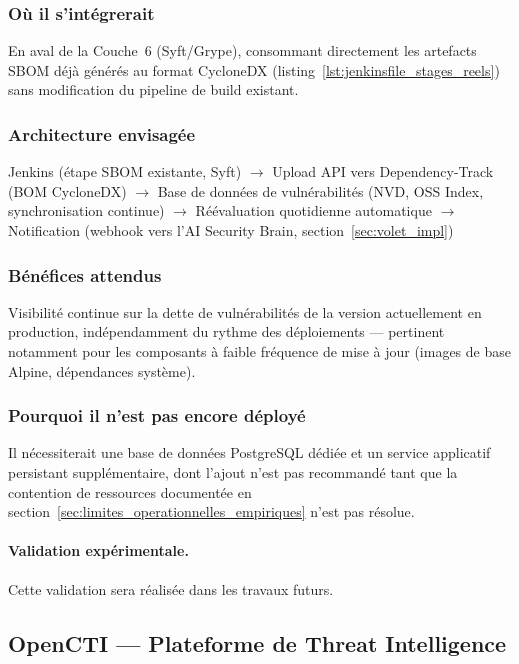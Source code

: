 \subsubsection{Où il s'intégrerait}
En aval de la Couche~6 (Syft/Grype), consommant directement les artefacts SBOM déjà générés au format CycloneDX (listing~\ref{lst:jenkinsfile_stages_reels}) sans modification du pipeline de build existant.

\subsubsection{Architecture envisagée}
\begin{center}
\scriptsize
Jenkins (étape SBOM existante, Syft) $\rightarrow$ Upload API vers Dependency-Track (BOM CycloneDX) $\rightarrow$ Base de données de vulnérabilités (NVD, OSS Index, synchronisation continue) $\rightarrow$ Réévaluation quotidienne automatique $\rightarrow$ Notification (webhook vers l'AI Security Brain, section~\ref{sec:volet_impl})
\end{center}

\subsubsection{Bénéfices attendus}
Visibilité continue sur la dette de vulnérabilités de la version actuellement en production, indépendamment du rythme des déploiements — pertinent notamment pour les composants à faible fréquence de mise à jour (images de base Alpine, dépendances système).

\subsubsection{Pourquoi il n'est pas encore déployé}
Il nécessiterait une base de données PostgreSQL dédiée et un service applicatif persistant supplémentaire, dont l'ajout n'est pas recommandé tant que la contention de ressources documentée en section~\ref{sec:limites_operationnelles_empiriques} n'est pas résolue.

\paragraph{Validation expérimentale.} Cette validation sera réalisée dans les travaux futurs.


\subsection{OpenCTI — Plateforme de Threat Intelligence}
\label{subsec:opencti_perspective}

